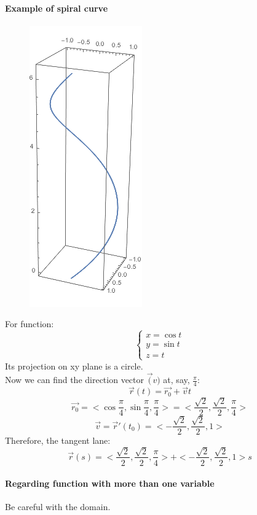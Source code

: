 \documentclass[11pt, oneside]{article}   	%
\begin{document}
\paragraph{Example of spiral curve}
\begin{figure}  %
    \centering
    \includegraphics[scale = 0.3]{spiral}
\end{figure}
For function:\\
\begin{equation}
  \begin{cases}
    x = \cos t\\
    y = \sin t \\
    z=  t
  \end{cases}
\end{equation}
Its projection on xy plane is a circle. \\
Now we can find the direction vector $\vec(v)$ at, say, $\frac{\pi}{4}$:
$$\vec{r}(t) = \vec{r_0} + \vec{v}t$$
$$\vec{r_0} = <\cos{\frac{\pi}{4}}, \sin{\frac{\pi}{4}}, \frac{\pi}{4}> = < \frac{\sqrt{2}}{2},\frac{\sqrt{2}}{2} , \frac{\pi}{4}>$$
$$\vec{v} = \vec{r}'(t_0) = < -\frac{\sqrt{2}}{2} , \frac{\sqrt{2}}{2} , 1>$$
Therefore, the tangent lane:
$$ \vec{r}(s) = < \frac{\sqrt{2}}{2},\frac{\sqrt{2}}{2} , \frac{\pi}{4}> + < -\frac{\sqrt{2}}{2} , \frac{\sqrt{2}}{2} , 1>s$$

\paragraph{Regarding function with more than one variable}
Be careful with the domain. 
\end{document}
